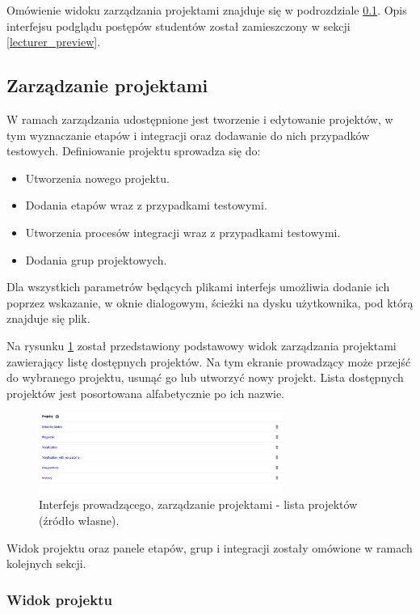Omówienie widoku zarządzania projektami znajduje się w podrozdziale \ref{lecturer-management}.
Opis interfejsu podglądu postępów studentów został zamieszczony w sekcji \ref{lecturer_preview}.

\subsection{Zarządzanie projektami}
\label{lecturer-management}

W ramach zarządzania udostępnione jest tworzenie i edytowanie projektów, w tym wyznaczanie etapów i integracji oraz dodawanie do nich przypadków testowych.
Definiowanie projektu sprowadza się do:
\begin {itemize}
    \item Utworzenia nowego projektu.
    \item Dodania etapów wraz z przypadkami testowymi.
    \item Utworzenia procesów integracji wraz z przypadkami testowymi.
    \item Dodania grup projektowych.
\end {itemize}

Dla wszystkich parametrów będących plikami interfejs umożliwia dodanie ich poprzez wskazanie, w oknie dialogowym, ścieżki na dysku użytkownika, pod którą znajduje się plik.

Na rysunku \ref{fig:lecturer_projects_list} został przedstawiony podstawowy widok zarządzania projektami zawierający listę dostępnych projektów.
Na tym ekranie prowadzący może przejść do wybranego projektu, usunąć go lub utworzyć nowy projekt.
Lista dostępnych projektów jest posortowana alfabetycznie po ich nazwie.

\begin{figure}[h]
    \centering
    \includegraphics[width = 8cm]{chapter04/lecturer_projects_list.png}
    \caption{Interfejs prowadzącego, zarządzanie projektami - lista projektów (źródło własne).}
    \label{fig:lecturer_projects_list}
\end{figure}

Widok projektu oraz panele etapów, grup i integracji zostały omówione w ramach kolejnych sekcji.

\subsubsection{Widok projektu}

